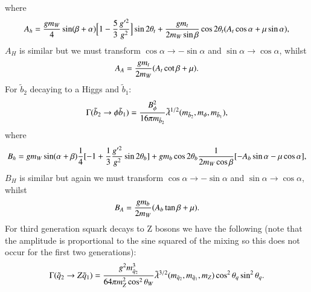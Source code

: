 \documentclass[final,3p,times,pdflatex]{elsarticle}
\begin{document}
where
\begin{equation}
\begin{aligned}
A_h = {g m_W \over 4} \sin(\beta+\alpha)\Big[1- {5 \over 3}{g'^2 \over g^2}\Big]\sin2\theta_t + {g m_t \over 2m_{W}\sin\beta}\cos2\theta_t (A_t \cos\alpha + \mu \sin\alpha),
\end{aligned}
\end{equation}
$A_H$ is similar but we must transform $\cos\alpha \rightarrow -\sin\alpha$ and $\sin\alpha \rightarrow \cos\alpha$, whilst
\begin{equation}
\begin{aligned}
A_A = {g m_t \over 2 m_W} (A_t \cot\beta + \mu).
\end{aligned}
\end{equation}
For $\tilde{b}_2$ decaying to a Higgs and $\tilde{b}_1$:
\begin{equation}\label{b2b1phi}
\begin{aligned}
\Gamma (\tilde{b}_2 \rightarrow \phi \tilde{b}_1) = {B_{\phi}^2 \over 16\pi m_{\tilde{b}_2} } \tilde{\lambda}^{1/2} (m_{\tilde{b}_2}, m_\phi, m_{\tilde{b}_1}),
\end{aligned}
\end{equation} 
where
\begin{equation}
\begin{aligned}
B_h = g m_W \sin(\alpha + \beta) {1 \over 4} [-1 + {1 \over 3}{g'^2 \over g^2} \sin2 \theta_b] + g m_b \cos2 \theta_b {1 \over 2 m_W \cos{\beta}} [ -A_b \sin\alpha - \mu \cos\alpha],
\end{aligned}
\end{equation}
$B_H$ is similar but again we must transform $\cos\alpha \rightarrow -\sin\alpha$ and $\sin\alpha \rightarrow \cos\alpha$, whilst
\begin{equation}
\begin{aligned}
B_A = {g m_b \over 2 m_W} (A_b \tan\beta +\mu).
\end{aligned}
\end{equation}
For third generation squark decays to Z bosons we have the following (note
that the amplitude is proportional to the sine squared of the mixing so this
does not occur for the first two generations): 
\begin{equation}\label{q2q1Z}
\begin{aligned}
\Gamma (\tilde{q}_2 \rightarrow Z \tilde{q}_1) = {g^2 m_{\tilde{q}_2}^3 \over 64\pi m_{Z}^2 \cos^2 \theta_W} \tilde{\lambda}^{3/2}(m_{\tilde{q}_2}, m_{\tilde{q}_1}, m_Z) \cos^2 \theta_q \sin^2 \theta_q.
\end{aligned}
\end{equation} 
\end{document}
